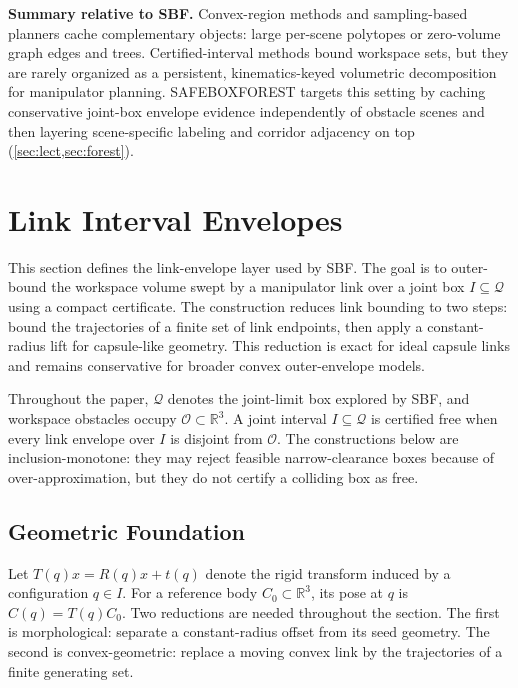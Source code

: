 \documentclass[journal]{IEEEtran}
\DeclareRobustCommand{\textsc}[1]{\textnormal{\MakeUppercase{#1}}}
\newcommand{\sbf}{\textsc{SBF}}
\newcommand{\Real}{\ensuremath{\mathbb{R}}}
\newcommand{\Q}{\ensuremath{\mathcal{Q}}}
\begin{document}
\textbf{Summary relative to \sbf.}
Convex-region methods and sampling-based planners cache complementary objects:
large per-scene polytopes or zero-volume graph edges and trees.
Certified-interval methods bound workspace sets, but they are rarely organized
as a persistent, kinematics-keyed volumetric decomposition for manipulator
planning. \textsc{SafeBoxForest} targets this setting by caching conservative
joint-box envelope evidence independently of obstacle scenes and then layering
scene-specific labeling and corridor adjacency on top (\cref{sec:lect,sec:forest}).

\section{Link Interval Envelopes}\label{sec:link_envelopes}

This section defines the link-envelope layer used by \sbf{}. The goal is to
outer-bound the workspace volume swept by a manipulator link over a joint box
$I \subseteq \Q$ using a compact certificate. The construction reduces link
bounding to two steps: bound the trajectories of a finite set of link endpoints,
then apply a constant-radius lift for capsule-like geometry. This reduction is
exact for ideal capsule links and remains conservative for broader convex
outer-envelope models.

Throughout the paper, $\Q$ denotes the joint-limit box explored by \sbf{}, and
workspace obstacles occupy $\mathcal{O}\subset\Real^3$. A joint interval
$I\subseteq\Q$ is certified free when every link envelope over $I$ is disjoint
from $\mathcal{O}$. The constructions below are inclusion-monotone: they may
reject feasible narrow-clearance boxes because of over-approximation, but they
do not certify a colliding box as free.

\subsection{Geometric Foundation}\label{sec:rewrite_geom}

Let $T(q)x = R(q)x + t(q)$ denote the rigid transform induced by a
configuration $q \in I$. For a reference body $C_0 \subset \Real^3$, its pose at
$q$ is $C(q)=T(q)C_0$. Two reductions are needed throughout the section. The
first is morphological: separate a constant-radius offset from its seed
geometry. The second is convex-geometric: replace a moving convex link by the
trajectories of a finite generating set.
\end{document}
